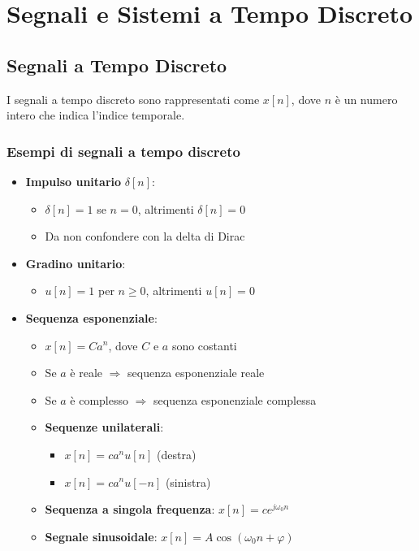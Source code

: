 \chapter{Segnali e Sistemi a Tempo Discreto}

\section{Segnali a Tempo Discreto}

I segnali a tempo discreto sono rappresentati come $x[n]$, dove $n$ è un numero intero che indica l'indice temporale.

\subsection*{Esempi di segnali a tempo discreto}

\begin{itemize}
    \item \textbf{Impulso unitario} $\delta[n]$: 
    \begin{itemize}
        \item $\delta[n]=1$ se $n = 0$, altrimenti $\delta[n]=0$
        \item Da non confondere con la delta di Dirac
    \end{itemize}
    \item \textbf{Gradino unitario}:
    \begin{itemize}
        \item $u[n]=1$ per $n\geq0$, altrimenti $u[n] = 0$
    \end{itemize}
    \item \textbf{Sequenza esponenziale}:
    \begin{itemize}
        \item $x[n]= Ca^n$, dove $C$ e $a$ sono costanti
        \item Se $a$ è reale $\Rightarrow$ sequenza esponenziale reale
        \item Se $a$ è complesso $\Rightarrow$ sequenza esponenziale complessa
        \item \textbf{Sequenze unilaterali}:
        \begin{itemize}
            \item $x[n]= ca^n u[n]$ (destra)
            \item $x[n]= ca^n u[-n]$ (sinistra)
        \end{itemize}
        \item \textbf{Sequenza a singola frequenza}: $x[n]= ce^{j\omega_0 n}$
        \item \textbf{Segnale sinusoidale}: $x[n]=A\cos(\omega_0n+\varphi)$
    \end{itemize}
\end{itemize}

